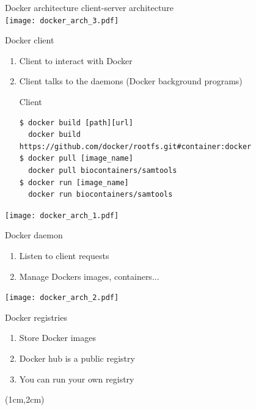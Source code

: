 \begin{frame}{Docker architecture}
client-server architecture \\
\centering\texttt{[image: docker\_arch\_3.pdf]}
\end{frame}

\begin{frame}[fragile]{Docker client}
\begin{enumerate}
\item<1-> Client to interact with Docker
\item<2-> Client talks to the daemons (Docker background programs)
\begin{block}{Client}
\begin{verbatim}
$ docker build [path][url] 
  docker build https://github.com/docker/rootfs.git#container:docker
$ docker pull [image_name]
  docker pull biocontainers/samtools
$ docker run [image_name]
  docker run biocontainers/samtools
\end{verbatim}
\end{block}
\end{enumerate}

\begin{center}
\texttt{[image: docker\_arch\_1.pdf]}
\end{center}
\end{frame}

\begin{frame}[<+->]{Docker daemon}
\begin{enumerate}
\item Listen to client requests
\item Manage Dockers images, containers...
\end{enumerate}
\centering\texttt{[image: docker\_arch\_2.pdf]}
\end{frame}

\begin{frame}[<+->]{Docker registries}
\begin{enumerate}
\item Store Docker images
\item Docker hub is a public registry
\item You can run your own registry
\end{enumerate}
\begin{textblock*}{10cm}(1cm,2cm)
\end{textblock*}
\end{frame}

